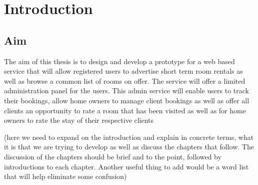 \chapter{Introduction}

\section{Aim}
The aim of this thesis is to design and develop a prototype for a web based service that will allow registered users to advertise short term room rentals as well as browse a common list of rooms on offer. The service will offer a limited administration panel for the users. This admin service will enable users to track their bookings, allow home owners to manage client bookings as well as offer all clients an opportunity to rate a room that has been visited as well as for home owners to rate the stay of their respective clients

(here we need to expand on the introduction and explain in concrete terms, what it is that we are trying to develop as well as discuss the chapters that follow. The discussion of the chapters should be brief and to the point, followed by introductions to each chapter. Another useful thing to add would be a word list that will help eliminate some confusion)